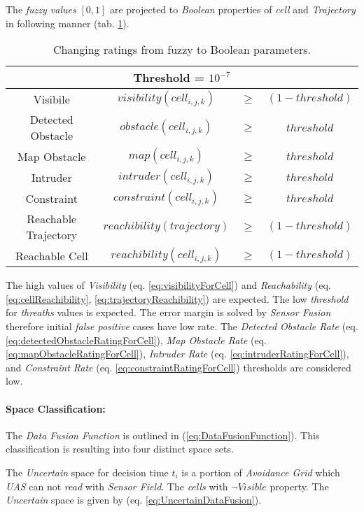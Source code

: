 The \emph{fuzzy values} $[0,1]$ are projected to \emph{Boolean} properties of \emph{cell} and \emph{Trajectory} in following manner (tab. \ref{tab:defuzificationRatings}).

\begin{table}[H]
    \centering
    \begin{tabular}{c|ccc}
        \multicolumn{4}{c}{Threshold = $10^{-7}$}\\\hline\hline
        Visibile & $visibility(cell_{i,j,k})$&$\ge$&$(1-threshold)$ \\\hline
        Detected Obstacle &  $obstacle(cell_{i,j,k}) $&$ \ge $&$ threshold$\\\hline
        Map Obstacle &  $map(cell_{i,j,k})$&$\ge$&$threshold$\\\hline
        Intruder &  $intruder(cell_{i,j,k})$&$\ge$&$threshold$\\\hline
        Constraint &  $constraint(cell_{i,j,k})$&$\ge$&$threshold$\\\hline\hline
        Reachable Trajectory &  $reachibility(trajectory)$&$\ge$&$(1-threshold)$\\\hline
        Reachable Cell &  $reachibility(cell_{i,j,k})$&$\ge$&$(1-threshold)$
    \end{tabular}
    \caption{Changing ratings from fuzzy to Boolean parameters.}
    \label{tab:defuzificationRatings}
\end{table}

The high values of \emph{Visibility} (eq. \ref{eq:visibilityForCell}) and \emph{Reachability} (eq. \ref{eq:cellReachibility}, \ref{eq:trajectoryReachibility}) are expected. The low \emph{threshold} for \emph{threaths} values is expected. The error margin is solved by \emph{Sensor Fusion} therefore initial \emph{false positive} cases have low rate. The \emph{Detected Obstacle Rate} (eq. \ref{eq:detectedObstacleRatingForCell}), \emph{Map Obstacle Rate} (eq. \ref{eq:mapObstacleRatingForCell}), \emph{Intruder Rate} (eq. \ref{eq:intruderRatingForCell}), and \emph{Constraint Rate} (eq. \ref{eq:constraintRatingForCell}) thresholds are considered low.

\paragraph{Space Classification:} The \emph{Data Fusion Function} is outlined in (\ref{eq:DataFusionFunction}). This classification is resulting into four distinct space sets.

The \emph{Uncertain} space for decision time $t_i$ is a portion of \emph{Avoidance Grid} which \emph{UAS} can not \emph{read} with \emph{Sensor Field}. The \emph{cells} with $\neg Visible$ property. The \emph{Uncertain} space is given by (eq. \ref{eq:UncertainDataFusion}).

